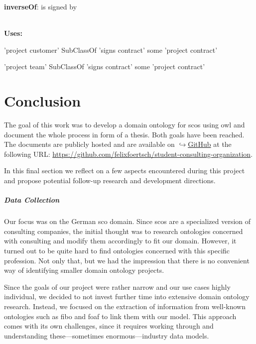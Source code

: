 \documentclass[a4paper, DIV=13, BCOR=0cm]{scrbook}
\newcommand{\link}[2]{\href{#1}{$\hookrightarrow$#2}}
\begin{document}
\begin{mdframed}[style=onto, frametitle={signs contract}]
	{%
		\begin{compactitem}
			\item \textbf{inverseOf}: is signed by
		\end{compactitem}
		\hrulefill\\
		\textbf{Uses:}
		\begin{compactitem}
			\item 'project customer' SubClassOf 'signs contract' some 'project contract'
			\item 'project team' SubClassOf 'signs contract' some 'project contract'
		\end{compactitem}
	} %
\end{mdframed}

\chapter{Conclusion}
The goal of this work was to develop a domain ontology for \glspl{sco} using \gls{owl} and document the whole process in form of a thesis. Both goals have been reached. The documents are publicly hosted and are available on \link{https://github.com}{GitHub} at the following URL: \url{https://github.com/felixfoertsch/student-consulting-organization}.

In this final section we reflect on a few aspects encountered during this project and propose potential follow-up research and development directions.

\paragraph{Data Collection}
Our focus was on the German \gls{sco} domain. Since \glspl{sco} are a specialized version of consulting companies, the initial thought was to research ontologies concerned with consulting and modify them accordingly to fit our domain. However, it turned out to be quite hard to find ontologies concerned with this specific profession. Not only that, but we had the impression that there is no convenient way of identifying smaller domain ontology projects.

Since the goals of our project were rather narrow and our use cases highly individual, we decided to not invest further time into extensive domain ontology research. Instead, we focused on the extraction of information from well-known ontologies such as \gls{fibo} and \gls{foaf} to link them with our model. This approach comes with its own challenges, since it requires working through and understanding these---sometimes enormous---industry data models.
\end{document}
